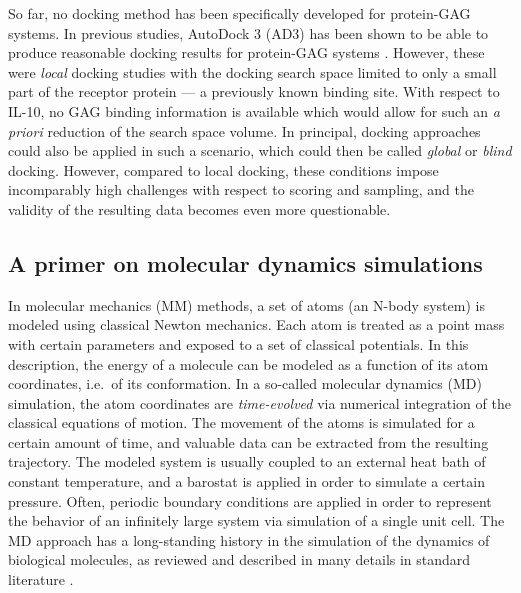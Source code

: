 So far, no docking method has been specifically developed for protein-GAG
systems. In previous studies, AutoDock 3 (AD3) \cite{Morris1998} has been shown
to be able to produce reasonable docking results for protein-GAG systems
\cite{japan_docking_ad3_clustering, samsonov_docking_2011}. However, these were
\textit{local} docking studies with the docking search space limited to only a
small part of the receptor protein --- a previously known binding site. With
respect to IL-10, no GAG binding information is available which would allow for
such an \textit{a priori} reduction of the search space volume. In principal,
docking approaches could also be applied in such a scenario, which could then be
called \textit{global} or \textit{blind} docking. However, compared to local
docking, these conditions impose incomparably high challenges with respect to
scoring and sampling, and the validity of the resulting data becomes even more
questionable.

\subsection{A primer on molecular dynamics simulations}


In molecular mechanics (MM) methods, a set of atoms (an N-body system) is
modeled using classical Newton mechanics. Each atom is treated as a point mass
with certain parameters and exposed to a set of classical potentials. In this
description, the energy of a molecule can be modeled as a function of its atom
coordinates, i.e.\ of its conformation. In a so-called molecular dynamics (MD)
simulation, the atom coordinates are \textit{time-evolved} via numerical
integration of the classical equations of motion. The movement of the atoms is
simulated for a certain amount of time, and valuable data can be extracted from
the resulting trajectory. The modeled system is usually coupled to an external
heat bath of constant temperature, and a barostat is applied in order to
simulate a certain pressure. Often, periodic boundary conditions are applied in
order to represent the behavior of an infinitely large system via simulation of
a single unit cell. The MD approach has a long-standing history in the
simulation of the dynamics of biological molecules, as reviewed and described in
many details in standard literature
\cite{mccammon1988dynamics}.

